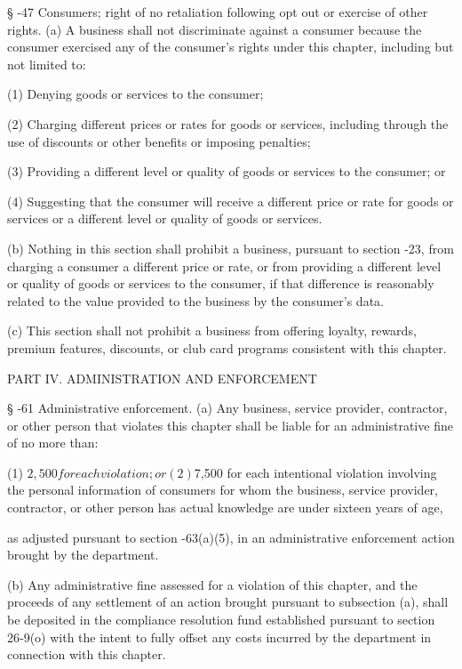      §   -47  Consumers; right of no retaliation following opt out or exercise of other rights.  (a)  A business shall not discriminate against a consumer because the consumer exercised any of the consumer's rights under this chapter, including but not limited to:

     (1)  Denying goods or services to the consumer;

     (2)  Charging different prices or rates for goods or services, including through the use of discounts or other benefits or imposing penalties;

     (3)  Providing a different level or quality of goods or services to the consumer; or

     (4)  Suggesting that the consumer will receive a different price or rate for goods or services or a different level or quality of goods or services.

     (b)  Nothing in this section shall prohibit a business, pursuant to section    -23, from charging a consumer a different price or rate, or from providing a different level or quality of goods or services to the consumer, if that difference is reasonably related to the value provided to the business by the consumer's data.

     (c)  This section shall not prohibit a business from offering loyalty, rewards, premium features, discounts, or club card programs consistent with this chapter.

PART IV.  ADMINISTRATION AND ENFORCEMENT

     §   -61  Administrative enforcement.  (a)  Any business, service provider, contractor, or other person that violates this chapter shall be liable for an administrative fine of no more than:

     (1)  $2,500 for each violation; or

     (2)  $7,500 for each intentional violation involving the personal information of consumers for whom the business, service provider, contractor, or other person has actual knowledge are under sixteen years of age,

as adjusted pursuant to section    -63(a)(5), in an administrative enforcement action brought by the department.

     (b)  Any administrative fine assessed for a violation of this chapter, and the proceeds of any settlement of an action brought pursuant to subsection (a), shall be deposited in the compliance resolution fund established pursuant to section 26‑9(o) with the intent to fully offset any costs incurred by the department in connection with this chapter.

